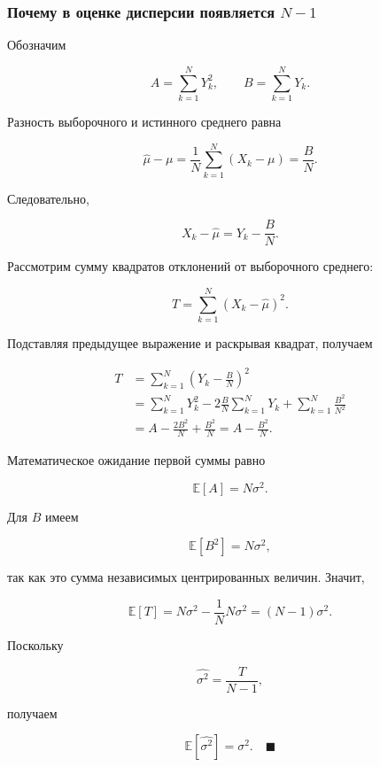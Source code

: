 \documentclass[
  russian,
  12pt,
  a4paper,
  a4paper,
  openany]{scrbook}
\begin{document}
\begin{bookderivation}

\subsubsection{\texorpdfstring{Почему в оценке дисперсии появляется
\(N-1\)}{Почему в оценке дисперсии появляется N-1}}\label{ux43fux43eux447ux435ux43cux443-ux432-ux43eux446ux435ux43dux43aux435-ux434ux438ux441ux43fux435ux440ux441ux438ux438-ux43fux43eux44fux432ux43bux44fux435ux442ux441ux44f-n-1}

Обозначим

\[
A=\sum_{k=1}^{N}Y_k^2,
\qquad
B=\sum_{k=1}^{N}Y_k.
\]

Разность выборочного и истинного среднего равна

\[
\widehat\mu-\mu
=
\frac1N\sum_{k=1}^{N}(X_k-\mu)
=
\frac{B}{N}.
\]

Следовательно,

\[
X_k-\widehat\mu
=Y_k-\frac{B}{N}.
\]

Рассмотрим сумму квадратов отклонений от выборочного среднего:

\[
T=\sum_{k=1}^{N}(X_k-\widehat\mu)^2.
\]

Подставляя предыдущее выражение и раскрывая квадрат, получаем

\[
\begin{aligned}
T
&=\sum_{k=1}^{N}\left(Y_k-\frac{B}{N}\right)^2\\
&=\sum_{k=1}^{N}Y_k^2
-2\frac{B}{N}\sum_{k=1}^{N}Y_k
+\sum_{k=1}^{N}\frac{B^2}{N^2}\\
&=A-\frac{2B^2}{N}+\frac{B^2}{N}
=A-\frac{B^2}{N}.
\end{aligned}
\]

Математическое ожидание первой суммы равно

\[
\mathbb E[A]=N\sigma^2.
\]

Для \(B\) имеем

\[
\mathbb E[B^2]=N\sigma^2,
\]

так как это сумма независимых центрированных величин. Значит,

\[
\mathbb E[T]
=
N\sigma^2-\frac1N N\sigma^2
=(N-1)\sigma^2.
\]

Поскольку

\[
\widehat{\sigma^2}=\frac{T}{N-1},
\]

получаем

\[
\boxed{
\mathbb E[\widehat{\sigma^2}]=\sigma^2.
}
\quad\blacksquare
\]

\end{bookderivation}
\end{document}

